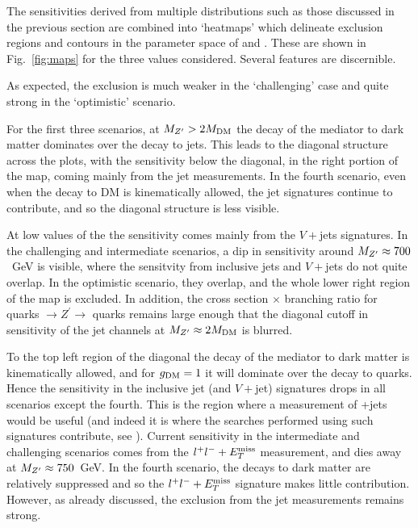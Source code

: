 \documentclass[floatfix]{article}
\begin{document}
The sensitivities derived from multiple distributions such as those discussed in the previous section are combined into `heatmaps' which delineate exclusion 
regions and contours in the parameter space of \MDM and \MZP. These are shown in Fig.~\ref{fig:maps} for the three \GQ values considered.
Several features are discernible. 

As expected, the exclusion is much weaker in the `challenging' case and quite strong in the `optimistic' scenario.

For the first three scenarios, at $M_{Z^{\prime}} > 2M_{\rm DM}$ the decay of the mediator to dark matter dominates over the decay to jets. This leads to the diagonal structure across the plots, 
with the sensitivity below the diagonal, in the right portion of the map, coming mainly from the jet measurements. In the fourth scenario, even when the decay to
DM is kinematically allowed, the jet signatures continue to contribute, and so the diagonal structure is less visible. 

At low values of the \MZP the sensitivity comes mainly from the $V+$jets signatures. In the challenging and intermediate scenarios, a dip in sensitivity around 
$M_{Z^{\prime}} \approx 700$~GeV is visible, where the sensitvity from inclusive jets and $V+$jets do not quite overlap. In the optimistic scenario, they overlap, and the whole lower
right region of the map is excluded. In addition, the cross section $\times$ branching ratio for quarks $\rightarrow Z^\prime \rightarrow$ quarks remains large
enough that the diagonal cutoff in sensitivity of the jet channels at $M_{Z^{\prime}} \approx 2M_{\rm DM}$ is blurred. 

To the top left region of the diagonal the decay of the mediator to dark matter is kinematically allowed, and for $g_{\rm DM}=1$ it will dominate 
over the decay to quarks. Hence the sensitivity in the inclusive jet (and $V+$jet) signatures drops in all scenarios except the fourth. 
This is the region where a measurement of \MET+jets would be useful 
(and indeed it is where the searches performed using such signatures contribute, see \cite{Kahlhoefer:2015bea}). Current sensitivity in the intermediate and challenging scenarios 
comes from the $l^+l^- + E_T^{\rm miss}$ measurement, and dies away at $M_{Z^{\prime}} \approx 750$~GeV. In the fourth scenario, the decays to dark matter are relatively suppressed and 
so the $l^+l^- + E_T^{\rm miss}$ signature makes little contribution. However, as already discussed, the exclusion from the jet measurements remains strong.
\end{document}
